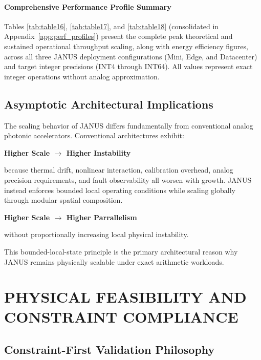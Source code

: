 \documentclass[journal]{IEEEtran}
\begin{document}
\paragraph{\textbf{Comprehensive Performance Profile Summary}}

Tables \ref{tab:table16}, \ref{tab:table17}, and \ref{tab:table18} (consolidated in Appendix~\ref{app:perf_profiles}) present the complete peak theoretical and sustained operational throughput scaling, along with energy efficiency figures, across all three JANUS deployment configurations (Mini, Edge, and Datacenter) and target integer precisions (INT4 through INT64). All values represent exact integer operations without analog approximation. 

\subsection{\textbf{Asymptotic Architectural Implications}}

The scaling behavior of JANUS differs fundamentally from conventional analog photonic accelerators.
Conventional architectures exhibit:

\begin{center}
\textbf{Higher Scale $\rightarrow$ Higher Instability}
\end{center}

because thermal drift, nonlinear interaction, calibration overhead, analog precision requirements, and fault observability all worsen with growth. JANUS instead enforces bounded local operating conditions while scaling globally through modular spatial composition.

\begin{center}
\textbf{Higher Scale $\rightarrow$ Higher Parrallelism}
\end{center}

without proportionally increasing local physical instability.

This bounded-local-state principle is the primary architectural reason why JANUS remains physically scalable under exact arithmetic workloads.

\section{PHYSICAL FEASIBILITY AND CONSTRAINT COMPLIANCE}

\subsection{\textbf{Constraint-First Validation Philosophy}}
\end{document}
